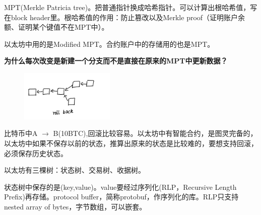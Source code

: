 \documentclass[10pt]{ctexart}
\begin{document}
MPT(Merkle Patricia tree)。把普通指针换成哈希指针。可以计算出根哈希值，写在block header里。根哈希值的作用：防止篡改以及Merkle proof（证明账户余额、证明某个键值不在MPT中）。

以太坊中用的是Modified MPT。合约账户中的存储用的也是MPT。

\textbf{为什么每次改变是新建一个分支而不是直接在原来的MPT中更新数据？}
\begin{figure}[H]
    \centering
    \includegraphics[width=0.4\textwidth]{./lecture16/img1.png} 
\end{figure}
比特币中A $\rightarrow$ B(10BTC),回滚比较容易。以太坊中有智能合约，是图灵完备的，以太坊中如果不保存以前的状态，推算出原来的状态是比较难的，要想支持回滚，必须保存历史状态。

以太坊有三棵树：状态树、交易树、收据树。

状态树中保存的是(key,value)。value要经过序列化(RLP，Recursive Length Prefix)再存储。protocol buffer，简称protobuf，作序列化的库。RLP只支持nested array of bytes，字节数组，可以嵌套。

 
\end{document}
